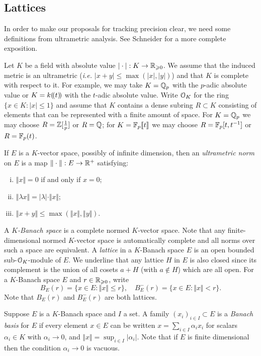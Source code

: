 \documentclass{lms}
\begin{document}
\subsection{Lattices}

In order to make our proposals for tracking precision clear, we need
some definitions from ultrametric analysis.  See 
Schneider \cite{schneider:11a} for a more complete exposition.

Let $K$ be a field with absolute value $|\cdot| : K \to \mathbb R_{\geqslant 0}$.
We assume that the induced metric is an ultrametric (\emph{i.e.}
$\lvert x + y \rvert \leq \max(\lvert x \rvert, \lvert y \rvert)$)
and that $K$ is complete with respect to it.
For example, we may take $K = \mathbb Q_p$ with the
$p$-adic absolute value or $K = k(\!( t )\!)$ with the $t$-adic absolute value.
Write $\OK$ for the ring $\{x \in K : \lvert x \rvert \le 1\}$ and assume
that $K$ contains a dense subring $R \subset K$
consisting of elements that can be represented with a finite amount of space.
For $K = \mathbb Q_p$ we may choose $R = \mathbb Z[\frac1p]$ or $R = \mathbb Q$;
for $K = \mathbb{F}_p\llbracket t \rrbracket$ we may choose $R = \mathbb{F}_p[t, t^{-1}]$ or $R = \mathbb{F}_p(t)$.

If $E$ is a $K$-vector space, possibly of infinite dimension, then an
\emph{ultrametric norm} on $E$ is a map $\Vert\cdot\Vert : E \to \mathbb R^+$ satisfying:
\begin{enumerate}[(i)]
\item $\Vert x\Vert = 0$ if and only if $x = 0$;
\item $\Vert \lambda x\Vert = |\lambda| \cdot \Vert x\Vert$;
\item $\Vert x+y\Vert \leq \max(\Vert x\Vert, \Vert y\Vert)$.
\end{enumerate}
A \emph{$K$-Banach space} is a complete normed $K$-vector space.  Note that any finite-dimensional
normed $K$-vector space is automatically complete and all norms over such a space are equivalent.
A \emph{lattice} in a $K$-Banach space $E$ is an open bounded sub-$\OK$-module of $E$.
We underline that any lattice $H$ in $E$ is also closed since its 
complement is the union of all cosets $a + H$ (with $a \not\in H$) which 
are all open.
For a $K$-Banach space $E$ and $r \in \mathbb R_{\geqslant 0}$, write
$$B_E(r) = \{ x \in E : \Vert x \Vert \le r \}, 
\quad B^-_E(r) = \{ x \in E : \Vert x \Vert < r\}.$$
Note that $B_E(r)$ and $B^-_E(r)$ are both lattices.

Suppose $E$ is a $K$-Banach space and $I$ a set.
A family $(x_i)_{i \in I} \subset E$ is a \emph{Banach basis} for $E$ if
every element $x \in E$ can be written $x = \sum_{i \in I} \alpha_i x_i$
for scalars $\alpha_i \in K$ with $\alpha_i \to 0$, and $\Vert x \Vert = \sup_{i \in I} \lvert \alpha_i \rvert$.
Note that if $E$ is finite dimensional then the condition $\alpha_i \to 0$ is vacuous.
\end{document}

